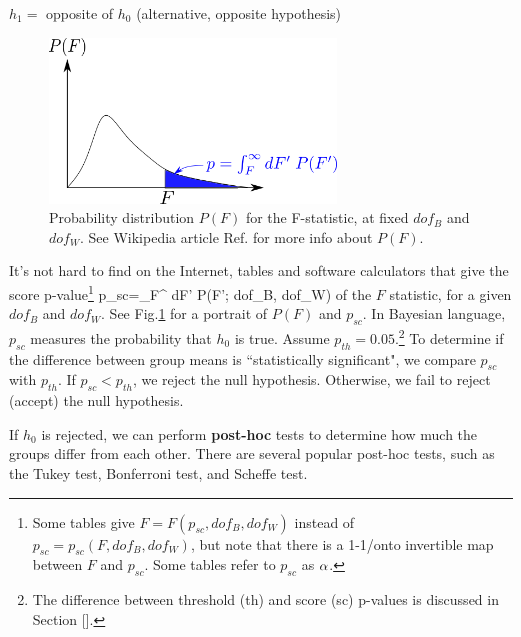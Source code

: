$h_1=$ opposite of $h_0$  (alternative, opposite hypothesis)

\begin{figure}[h!]
\centering
\includegraphics[width=3in]
{ANOVA/f-dist.png}
\caption{Probability distribution $P(F)$
for the F-statistic, 
at fixed $dof_B$ and $dof_W$. See Wikipedia article
Ref.\cite{wiki-f-dist}
for more info about $P(F)$.}
\label{fig-f-dist}
\end{figure}

It's not
hard to find on the Internet, tables 
and 
software calculators 
that give 
the score p-value\footnote{Some tables give
$F=F(p_{sc}, dof_B, dof_W)$
instead of $p_{sc}=p_{sc}(F, dof_B, dof_W)$,
but note that there is a 1-1/onto 
invertible map between $F$ and $p_{sc}$.
Some tables refer  to $p_{sc}$
as $\alpha$.
} 
\beq
p_{sc}=\int_{F}^{\infty}
dF'\; P(F'; dof_B, dof_W)
\eeq
of the $F$ statistic,
for a given $dof_B$ and $dof_W$.
See Fig.\ref{fig-f-dist} 
for a portrait of $P(F)$ and $p_{sc}$.
In Bayesian language,
$p_{sc}$
measures
the probability
that $h_0$ is true.
Assume $p_{th}=0.05$.\footnote{
The difference between 
threshold (th)
and score (sc) p-values
is discussed in Section [].}
To determine if the difference between group means is ``statistically significant", 
we compare $p_{sc}$ with $p_{th}$. 
If $p_{sc}<p_{th}$, we reject the null hypothesis.
Otherwise, we fail to reject (accept) the null hypothesis.

If $h_0$ is rejected,  we can  perform {\bf post-hoc} tests to determine how much 
the groups differ from each other.
There are several  popular post-hoc tests,
such as 
the
Tukey test,
Bonferroni test, and 
Scheffe test.